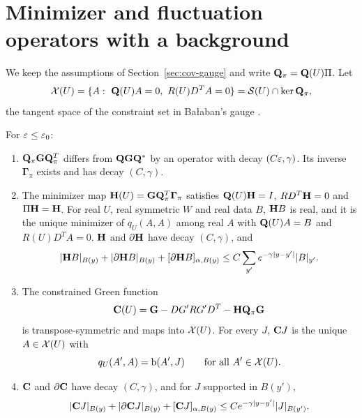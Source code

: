 \section{Minimizer and fluctuation operators with a background}\label{sec:cov-min}

We keep the assumptions of Section~\ref{sec:cov-gauge} and write $\mathbf Q_\pi=\mathbf Q(U)\Pi$. Let
\[
\mathcal X(U)=\{A:\ \mathbf Q(U)A=0,\ R(U)D^TA=0\}=\mathcal S(U)\cap\ker\mathbf Q_\pi ,
\]
the tangent space of the constraint set in Ba\l aban's gauge \cite[(100)]{BalVar}.

\begin{theorem}\label{thm:cov-min}
For $\varepsilon\le\varepsilon_0$:
\begin{enumerate}[label=(\alph*)]
\item $\mathbf Q_\pi\mathbf G\mathbf Q_\pi^T$ differs from $\mathbf Q\mathbf G\mathbf Q^*$ by an operator with decay $(C\varepsilon,\gamma)$. Its inverse $\boldsymbol\Gamma_\pi$ exists and has decay $(C,\gamma)$.
\item The minimizer map $\mathbf H(U)=\mathbf G\mathbf Q_\pi^T\boldsymbol\Gamma_\pi$ satisfies $\mathbf Q(U)\mathbf H=I$, $RD^T\mathbf H=0$ and $\Pi\mathbf H=\mathbf H$. For real $U$, real symmetric $W$ and real data $B$, $\mathbf H B$ is real, and it is the unique minimizer of $q_U(A,A)$ among real $A$ with $\mathbf Q(U)A=B$ and $R(U)D^TA=0$. $\mathbf H$ and $\partial\mathbf H$ have decay $(C,\gamma)$, and
\[
|\mathbf H B|_{B(y)}+|\partial\mathbf H B|_{B(y)}+[\partial\mathbf H B]_{\alpha,B(y)}\le C\sum_{y'}e^{-\gamma|y-y'|}|B|_{y'} .
\]
\item The constrained Green function
\[
\mathbf C(U)=\mathbf G-DG'RG'D^T-\mathbf H\mathbf Q_\pi\mathbf G
\]
is transpose-symmetric and maps into $\mathcal X(U)$. For every $J$, $\mathbf C J$ is the unique $A\in\mathcal X(U)$ with
\[
q_U(A',A)=\mathrm b(A',J)\qquad\text{for all }A'\in\mathcal X(U).
\]
\item $\mathbf C$ and $\partial\mathbf C$ have decay $(C,\gamma)$, and for $J$ supported in $B(y')$,
\[
|\mathbf C J|_{B(y)}+|\partial\mathbf C J|_{B(y)}+[\mathbf C J]_{\alpha,B(y)}\le Ce^{-\gamma|y-y'|}|J|_{B(y')} .
\]
\end{enumerate}
\end{theorem}

